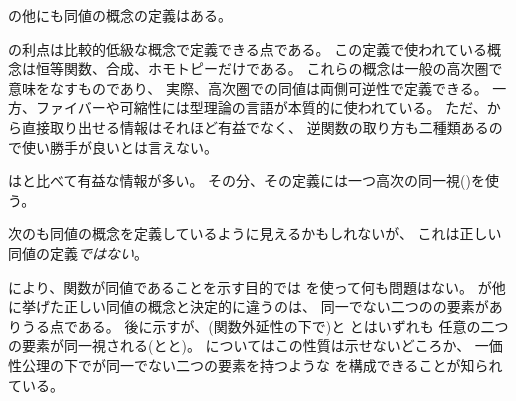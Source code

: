 \documentclass[index]{subfiles}
\begin{document}

の他にも同値の概念の定義はある。




の利点は比較的低級な概念で定義できる点である。
この定義で使われている概念は恒等関数、合成、ホモトピーだけである。
これらの概念は一般の高次圏で意味をなすものであり、
実際、高次圏での同値は両側可逆性で定義できる。
一方、ファイバーや可縮性には型理論の言語が本質的に使われている。
ただ、から直接取り出せる情報はそれほど有益でなく、
逆関数の取り方も二種類あるので使い勝手が良いとは言えない。




はと比べて有益な情報が多い。
その分、その定義には一つ高次の同一視(\myInlineMath{\myIsHAECoh})を使う。

次のも同値の概念を定義しているように見えるかもしれないが、
これは正しい同値の定義\emph{ではない}。




により、関数が同値であることを示す目的では
を使って何も問題はない。
が他に挙げた正しい同値の概念と決定的に違うのは、
同一でない二つのの要素がありうる点である。
後に示すが、(関数外延性の下で)と
とはいずれも
任意の二つの要素が同一視される(とと)。
についてはこの性質は示せないどころか、
一価性公理の下でが同一でない二つの要素を持つような
を構成できることが知られている。
\end{document}
